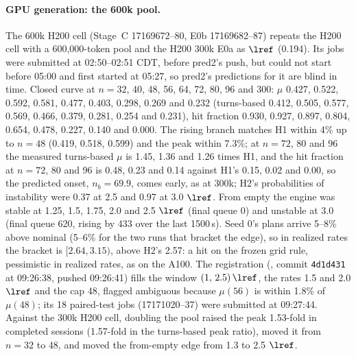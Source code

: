 \paragraph{GPU generation: the 600k pool.} The 600k H200 cell (Stage~C 17169672--80, E0b 17169682--87) repeats the H200 cell with a 600,000-token pool and the H200 300k E0a as $\lref$ (0.194\sps). Its jobs were submitted at 02:50--02:51 CDT, before pred2's push, but could not start before 05:00 and first started at 05:27, so pred2's predictions for it are blind in time. Closed curve at $n=32$, 40, 48, 56, 64, 72, 80, 96 and 300: $\mu$ 0.427, 0.522, 0.592, 0.581, 0.477, 0.403, 0.298, 0.269 and 0.232\sps{} (turns-based 0.412, 0.505, 0.577, 0.569, 0.466, 0.379, 0.281, 0.254 and 0.231), hit fraction 0.930, 0.927, 0.897, 0.804, 0.654, 0.478, 0.227, 0.140 and 0.000. The rising branch matches H1 within 4\% up to $n=48$ (0.419, 0.518, 0.599) and the peak within 7.3\%; at $n=72$, 80 and 96 the measured turns-based $\mu$ is 1.45, 1.36 and 1.26 times H1, and the hit fraction at $n=72$, 80 and 96 is 0.48, 0.23 and 0.14 against H1's 0.15, 0.02 and 0.00, so the predicted onset, $n_b=69.9$, comes early, as at 300k; H2's probabilities of instability were 0.37 at 2.5 and 0.97 at 3.0 $\lref$. From empty the engine was stable at 1.25, 1.5, 1.75, 2.0 and 2.5 $\lref$ (final queue 0) and unstable at 3.0 (final queue 620, rising by 433 over the last 1500\,s). Seed 0's plans arrive 5--8\% above nominal (5--6\% for the two runs that bracket the edge), so in realized rates the bracket is $[2.64,3.15)$, above H2's 2.57: a hit on the frozen grid rule, pessimistic in realized rates, as on the A100. The registration (, commit \texttt{4d1d431} at 09:26:38, pushed 09:26:41) fills the window $(1,\,2.5)\,\lref$, the rates 1.5 and 2.0 $\lref$ and the cap 48, flagged ambiguous because $\mu(56)$ is within 1.8\% of $\mu(48)$; its 18 paired-test jobs (17171020--37) were submitted at 09:27:44. Against the 300k H200 cell, doubling the pool raised the peak 1.53-fold in completed sessions (1.57-fold in the turns-based peak ratio), moved it from $n=32$ to 48, and moved the from-empty edge from 1.3 to 2.5 $\lref$.

